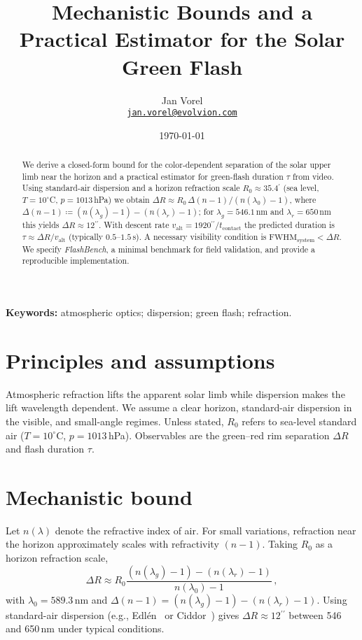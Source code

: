 \documentclass[11pt]{article}
\title{Mechanistic Bounds and a Practical Estimator for the Solar Green Flash}
\author{%
  Jan Vorel\\
  \texttt{\href{mailto:jan.vorel@evolvion.com}{jan.vorel@evolvion.com}}
}
\date{\today}
\newcommand{\arcmin}{\ensuremath{^{\prime}}}
\newcommand{\arcsec}{\ensuremath{^{\prime\prime}}}
\begin{document}
\maketitle

\begin{abstract}
We derive a closed-form bound for the color-dependent separation of the solar upper limb near the horizon and a practical estimator for green-flash duration $\tau$ from video. Using standard-air dispersion and a horizon refraction scale $R_0\!\approx\!35.4\arcmin$ (sea level, $T{=}10^\circ$C, $p{=}1013$\,hPa) we obtain
$\Delta R \approx R_0\,{\Delta(n-1)}/{(n(\lambda_0)-1)}$, where $\Delta(n-1)\coloneqq (n(\lambda_g)-1)-(n(\lambda_r)-1)$; for $\lambda_g\!=\!546.1$\,nm and $\lambda_r\!=\!650$\,nm this yields $\Delta R\!\approx\!12\arcsec$. With descent rate $v_{\mathrm{alt}}\!=\!1920\arcsec/t_{\mathrm{contact}}$ the predicted duration is $\tau\!\approx\!\Delta R/v_{\mathrm{alt}}$ (typically $0.5$--$1.5$\,s). A necessary visibility condition is $\mathrm{FWHM}_{\mathrm{system}}\!<\!\Delta R$. We specify \emph{FlashBench}, a minimal benchmark for field validation, and provide a reproducible implementation.
\end{abstract}

\noindent\textbf{Keywords:} atmospheric optics; dispersion; green flash; refraction.

\section{Principles and assumptions}
Atmospheric refraction lifts the apparent solar limb while dispersion makes the lift wavelength dependent. We assume a clear horizon, standard-air dispersion in the visible, and small-angle regimes. Unless stated, $R_0$ refers to sea-level standard air ($T{=}10^\circ$C, $p{=}1013$\,hPa). Observables are the green--red rim separation $\Delta R$ and flash duration $\tau$.

\section{Mechanistic bound}
Let $n(\lambda)$ denote the refractive index of air. For small variations, refraction near the horizon approximately scales with refractivity $(n-1)$. Taking $R_0$ as a horizon refraction scale,
\begin{equation}
\Delta R \approx R_0\frac{(n(\lambda_g)-1)-(n(\lambda_r)-1)}{n(\lambda_0)-1}\,,
\end{equation}
with $\lambda_0=589.3$\,nm and $\Delta(n-1)=(n(\lambda_g)-1)-(n(\lambda_r)-1)$. Using standard-air dispersion (e.g., Edl\'en~\cite{Edlen1966} or Ciddor~\cite{Ciddor1996}) gives $\Delta R\approx 12\arcsec$ between 546 and 650\,nm under typical conditions.
\end{document}

